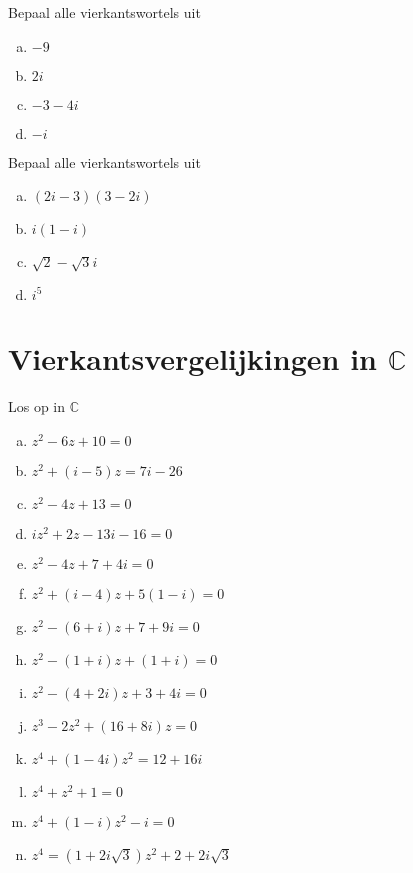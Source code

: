 \documentclass[12pt,twoside]{article}
\begin{document}
\begin{oefening}
  Bepaal alle vierkantswortels uit
  \begin{enumerate}[(a)]
    \itemsep 1em
  \item $-9$
  \item $2i$
  \item $-3-4i$
  \item $-i$
  \end{enumerate}
\end{oefening}

\begin{oefening}
  Bepaal alle vierkantswortels uit
  \begin{enumerate}[(a)]
    \itemsep 1em
  \item $(2i-3)(3-2i)$
  \item $i(1-i)$
  \item $\sqrt{2}-\sqrt{3}i$
  \item $i^5$
  \end{enumerate}
\end{oefening}

\pagebreak
\section{Vierkantsvergelijkingen in $\mathbb{C}$}

\begin{oefening}
  Los op in $\mathbb{C}$
  \begin{enumerate}[(a)]
    \itemsep 1em
  \item $z^2-6z+10=0$
  \item $z^2+(i-5)z=7i-26$
  \item $z^2-4z+13=0$
  \item $iz^2+2z-13i-16=0$
  \item $z^2-4z+7+4i=0$
  \item $z^2+(i-4)z+5(1-i)=0$
  \item $z^2-(6+i)z+7+9i=0$
  \item $z^2-(1+i)z+(1+i)=0$
  \item $z^2-(4+2i)z+3+4i=0$
  \item $z^3-2z^2+(16+8i)z=0$
  \item $z^4+(1-4i)z^2=12+16i$
  \item $z^4+z^2+1=0$
  \item $z^4+(1-i)z^2-i=0$
  \item $z^4=(1+2i\sqrt{3})z^2+2+2i\sqrt{3}$
  \end{enumerate}
\end{oefening}
\end{document}
